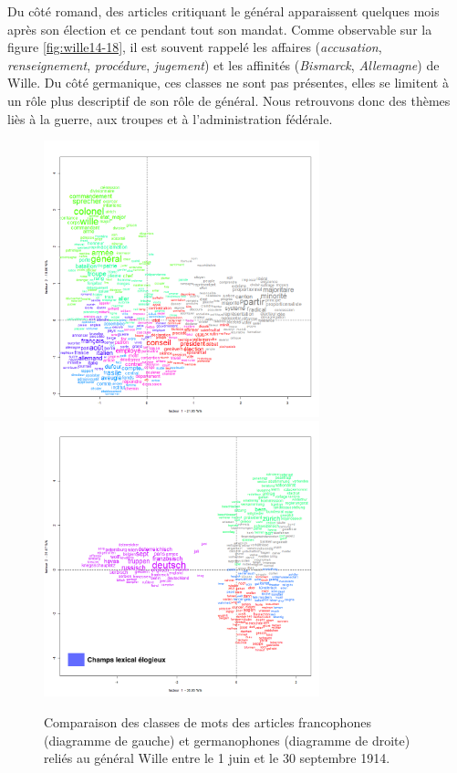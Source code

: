 \documentclass[french,a4paper]{article}
\begin{document}
Du côté romand, des articles critiquant le général apparaissent quelques mois après son élection et ce pendant tout son mandat.
Comme observable sur la figure \ref{fig:wille14-18}, il est souvent rappelé les affaires (\textit{accusation}, \textit{renseignement}, \textit{procédure}, \textit{jugement}) et les affinités (\textit{Bismarck}, \textit{Allemagne}) de Wille.
Du côté germanique, ces classes ne sont pas présentes, elles se limitent à un rôle plus descriptif de son rôle de général. Nous retrouvons donc des thèmes liès à la guerre, aux troupes et à l'administration fédérale.

\begin{figure}[h!]
    \includegraphics[width=8cm]{imgs/FR/Wille_15classes_election.png}
    \includegraphics[width=8cm]{imgs/DE/Wille_15classes_election.png}
    \caption{Comparaison des classes de mots des articles francophones (diagramme de gauche) et germanophones (diagramme de droite) reliés au général Wille entre le 1\ier{} juin et le 30 septembre 1914.}
    \centering
    \label{fig:wille14}
\end{figure}
\end{document}

